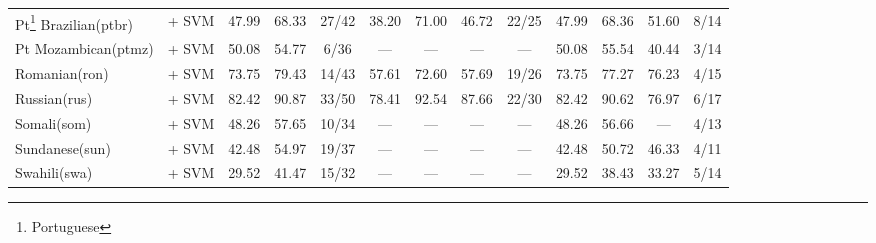 \begin{table*}[h]
{\begin{tabular}{l|c|ccc|cccc|cccc}
            Pt\footnote{Portuguese} Brazilian(ptbr) & \citep{souza2020bertimbau} + SVM                                                             & 47.99                        & 68.33                        & 27/42                       & 38.20         & 71.00         & 46.72             & 22/25         & 47.99         & 68.36         & 51.60             & 8/14          \\
            Pt Mozambican(ptmz)                     & \citep{wang2024multilingual}   + SVM                                                         & 50.08                        & 54.77                        & 6/36                        & —             & —             & —                 & —             & 50.08         & 55.54         & 40.44             & 3/14          \\
            Romanian(ron)                           & \citep{wang2024multilingual}     + SVM                                                       & 73.75                        & 79.43                        & 14/43                       & 57.61         & 72.60         & 57.69             & 19/26         & 73.75         & 77.27         & 76.23             & 4/15          \\
            Russian(rus)                            & \citep{snegirev2025russianfocusedembeddersexplorationrumteb}     + SVM                       & 82.42                        & 90.87                        & 33/50                       & 78.41         & 92.54         & 87.66             & 22/30         & 82.42         & 90.62         & 76.97             & 6/17          \\
            Somali(som)                             & \citep{wang2024multilingual}       + SVM                                                     & 48.26                        & 57.65                        & 10/34                       & —             & —             & —                 & —             & 48.26         & 56.66         & —                 & 4/13          \\
            Sundanese(sun)                          & \citep{wang2024multilingual}      + SVM                                                      & 42.48                        & 54.97                        & 19/37                       & —             & —             & —                 & —             & 42.48         & 50.72         & 46.33             & 4/11          \\
            Swahili(swa)                            & \citep{wang2024multilingual}      + SVM                                                      & 29.52                        & 41.47                        & 15/32                       & —             & —             & —                 & —             & 29.52         & 38.43         & 33.27             & 5/14          \\

\end{tabular}}
\end{table*}
